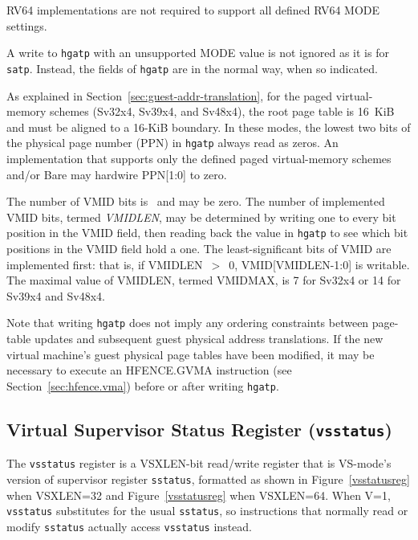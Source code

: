 RV64 implementations are not required to support all defined RV64 MODE
settings.

A write to {\tt hgatp} with an unsupported MODE value is not ignored as it is
for {\tt satp}.
Instead, the fields of {\tt hgatp} are {\warl} in the normal way, when so
indicated.

As explained in Section~\ref{sec:guest-addr-translation}, for the paged
virtual-memory schemes (Sv32x4, Sv39x4, and Sv48x4), the root page table is
16~KiB and must be aligned to a 16-KiB boundary.
In these modes, the lowest two bits of the physical page number (PPN) in
{\tt hgatp} always read as zeros.
An implementation that supports only the defined paged virtual-memory schemes
and/or Bare may hardwire PPN[1:0] to zero.

The number of VMID bits is \unspecified\ and may be zero.
The number of implemented VMID bits, termed {\mbox {\em VMIDLEN}}, may be
determined by writing one to every bit position in the VMID field, then reading
back the value in {\tt hgatp} to see which bit positions in the VMID field hold
a one.
The least-significant bits of VMID are implemented first:
that is, if VMIDLEN~$>$~0, VMID[VMIDLEN-1:0] is writable.
The maximal value of VMIDLEN, termed VMIDMAX, is 7 for Sv32x4 or 14 for Sv39x4
and Sv48x4.

Note that writing {\tt hgatp} does not imply any ordering constraints between
page-table updates and subsequent guest physical address translations.
If the new virtual machine's guest physical page tables have been modified, it
may be necessary to execute an HFENCE.GVMA instruction
(see Section~\ref{sec:hfence.vma}) before or after writing {\tt hgatp}.

\subsection{Virtual Supervisor Status Register ({\tt vsstatus})}

The {\tt vsstatus} register is a VSXLEN-bit read/write register that is
VS-mode's version of supervisor register {\tt sstatus}, formatted as
shown in Figure~\ref{vsstatusreg} when VSXLEN=32 and
Figure~\ref{vsstatusreg} when VSXLEN=64.
When V=1, {\tt vsstatus} substitutes for the usual {\tt sstatus}, so
instructions that normally read or modify {\tt sstatus} actually access
{\tt vsstatus} instead.

